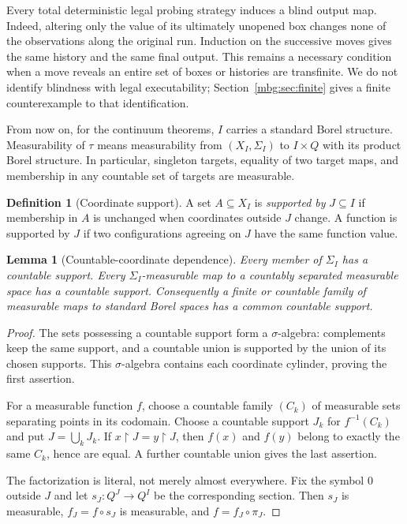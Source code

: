 \documentclass[11pt,letterpaper]{article}
\newtheorem{lemma}[theorem]{Lemma}
\theoremstyle{definition}
\newtheorem{definition}[theorem]{Definition}
\newcommand{\Sig}{\Sigma}
\newcommand{\restr}{\mathbin{\upharpoonright}}
\begin{document}
Every total deterministic legal probing strategy induces a blind output map. Indeed, altering only the value of its ultimately unopened box changes none of the observations along the original run. Induction on the successive moves gives the same history and the same final output. This remains a necessary condition when a move reveals an entire set of boxes or histories are transfinite. We do not identify blindness with legal executability; Section~\ref{mbg:sec:finite} gives a finite counterexample to that identification.

From now on, for the continuum theorems, $I$ carries a standard Borel structure. Measurability of $\tau$ means measurability from $(X_I,\Sig_I)$ to $I\times Q$ with its product Borel structure. In particular, singleton targets, equality of two target maps, and membership in any countable set of targets are measurable.

\begin{definition}[Coordinate support]
A set $A\subseteq X_I$ is \emph{supported by} $J\subseteq I$ if membership in $A$ is unchanged when coordinates outside $J$ change. A function is supported by $J$ if two configurations agreeing on $J$ have the same function value.
\end{definition}

\begin{lemma}[Countable-coordinate dependence]
\label{mbg:lem:support}
Every member of $\Sig_I$ has a countable support. Every $\Sig_I$-measurable map to a countably separated measurable space has a countable support. Consequently a finite or countable family of measurable maps to standard Borel spaces has a common countable support.
\end{lemma}
\begin{proof}
The sets possessing a countable support form a $\sigma$-algebra: complements keep the same support, and a countable union is supported by the union of its chosen supports. This $\sigma$-algebra contains each coordinate cylinder, proving the first assertion.

For a measurable function $f$, choose a countable family $(C_k)$ of measurable sets separating points in its codomain. Choose a countable support $J_k$ for $f^{-1}(C_k)$ and put $J=\bigcup_kJ_k$. If $x\restr J=y\restr J$, then $f(x)$ and $f(y)$ belong to exactly the same $C_k$, hence are equal. A further countable union gives the last assertion.

The factorization is literal, not merely almost everywhere. Fix the symbol $0$ outside $J$ and let $s_J:Q^J\to Q^I$ be the corresponding section. Then $s_J$ is measurable, $f_J=f\circ s_J$ is measurable, and $f=f_J\circ\pi_J$.
\end{proof}
\end{document}
